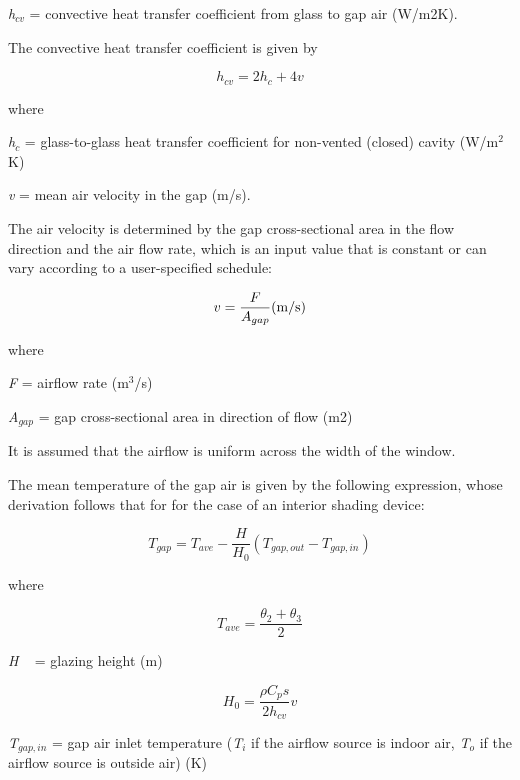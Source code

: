 \emph{h\(_{cv}\)} = convective heat transfer coefficient from glass to gap air (W/m2K).

The convective heat transfer coefficient is given by

\begin{equation}
{h_{cv}} = 2{h_c} + 4v
\end{equation}

where

\emph{h\(_{c}\)} = glass-to-glass heat transfer coefficient for non-vented (closed) cavity (W/m\(^{2}\)K)

\emph{v} = mean air velocity in the gap (m/s).

The air velocity is determined by the gap cross-sectional area in the flow direction and the air flow rate, which is an input value that is constant or can vary according to a user-specified schedule:

\begin{equation}
v = \frac{F}{{{A_{gap}}}}{\rm{      (m/s)}}
\end{equation}

where

\emph{F} = airflow rate (m\(^{3}\)/s)

\emph{A\(_{gap}\)} = gap cross-sectional area in direction of flow (m2)

It is assumed that the airflow is uniform across the width of the window.

The mean temperature of the gap air is given by the following expression, whose derivation follows that for for the case of an interior shading device:

\begin{equation}
{T_{gap}} = {T_{ave}} - \frac{H}{{{H_0}}}({T_{gap,out}} - {T_{gap,in}})
\end{equation}

where

\begin{equation}
{T_{ave}} = \frac{{{\theta_2} + {\theta_3}}}{2}
\end{equation}

\emph{H} ~ = glazing height (m)

\begin{equation}
{H_0} = \frac{{\rho {C_p}s}}{{2{h_{cv}}}}v
\end{equation}

\emph{T\(_{gap,in}\)} = gap air inlet temperature (\emph{T\(_{i}\)} if the airflow source is indoor air, \emph{T\(_{o}\)} if the airflow source is outside air) (K)

